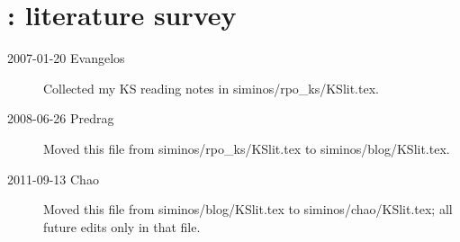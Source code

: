 
\section{\KS: literature survey}
\label{sec:KSlit}

\begin{description}

\item[2007-01-20 Evangelos]
Collected my KS reading notes in siminos/rpo\_ks/KSlit.tex.

\item[2008-06-26 Predrag]
Moved this file from siminos/rpo\_ks/KSlit.tex to
siminos/blog/KSlit.tex.

\item[2011-09-13 Chao]
Moved this file from siminos/blog/KSlit.tex to siminos/chao/KSlit.tex;
all future edits only in that file.

\end{description}


